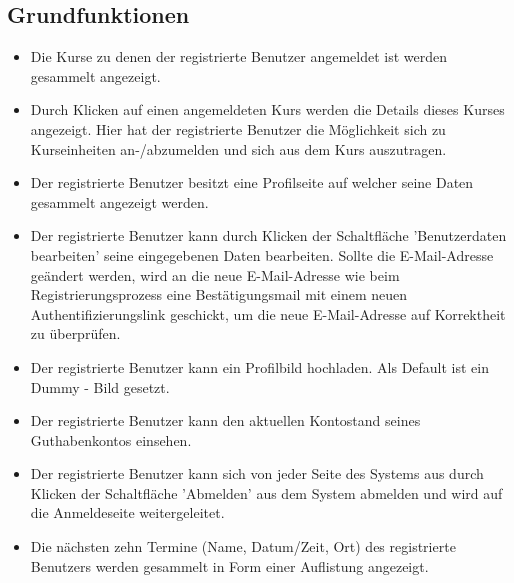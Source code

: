 \documentclass[a4paper]{scrreprt}
\begin{document}
\subsection{Grundfunktionen}
\begin{itemize}
	\item {}
	Die Kurse zu denen der registrierte Benutzer angemeldet ist werden gesammelt angezeigt.
	\item {}
	Durch Klicken auf einen angemeldeten Kurs werden die Details dieses Kurses angezeigt. Hier hat der registrierte Benutzer die Möglichkeit sich zu Kurseinheiten an-/abzumelden und sich aus dem Kurs auszutragen.
	\item {}
	Der registrierte Benutzer besitzt eine Profilseite auf welcher seine Daten gesammelt angezeigt werden. 
	\item {}
	Der registrierte Benutzer kann durch Klicken der Schaltfläche 'Benutzerdaten bearbeiten' seine eingegebenen Daten bearbeiten. Sollte die E-Mail-Adresse geändert werden, wird an die neue E-Mail-Adresse wie beim Registrierungsprozess eine Bestätigungsmail mit einem neuen Authentifizierungslink geschickt, um die neue E-Mail-Adresse auf Korrektheit zu überprüfen.
	\item {}
	Der registrierte Benutzer kann ein Profilbild hochladen. Als Default ist ein Dummy - Bild gesetzt.
	\item {}
	Der registrierte Benutzer kann den aktuellen Kontostand seines Guthabenkontos einsehen. 
	\item {}
	Der registrierte Benutzer kann sich  von jeder Seite des Systems aus durch Klicken der Schaltfläche 'Abmelden' aus dem System abmelden und wird auf die Anmeldeseite weitergeleitet.
	\item {}
	Die nächsten zehn Termine (Name, Datum/Zeit, Ort) des registrierte Benutzers werden gesammelt in Form einer Auflistung angezeigt.
\end{itemize}		
\end{document}

